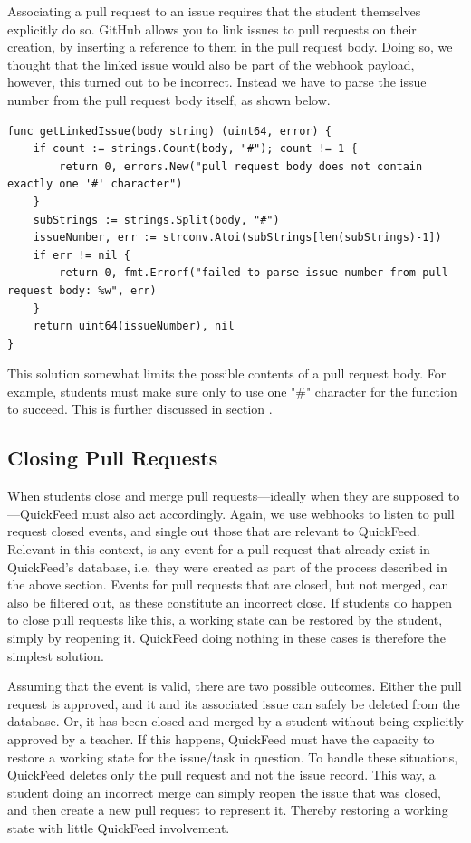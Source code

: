 Associating a pull request to an issue requires that the student themselves explicitly do so.
GitHub allows you to link issues to pull requests on their creation, by inserting a reference to them in the pull request body.
Doing so, we thought that the linked issue would also be part of the webhook payload, however, this turned out to be incorrect.
Instead we have to parse the issue number from the pull request body itself, as shown below.
\begin{lstlisting}[caption={The getLinkedIssue function}, language=Golang]
func getLinkedIssue(body string) (uint64, error) {
	if count := strings.Count(body, "#"); count != 1 {
		return 0, errors.New("pull request body does not contain exactly one '#' character")
	}
	subStrings := strings.Split(body, "#")
	issueNumber, err := strconv.Atoi(subStrings[len(subStrings)-1])
	if err != nil {
		return 0, fmt.Errorf("failed to parse issue number from pull request body: %w", err)
	}
	return uint64(issueNumber), nil
}
\end{lstlisting}

This solution somewhat limits the possible contents of a pull request body.
For example, students must make sure only to use one "\#" character for the function to succeed.
This is further discussed in section .%

\subsection{Closing Pull Requests}

When students close and merge pull requests---ideally when they are supposed to---QuickFeed must also act accordingly.
Again, we use webhooks to listen to pull request closed events, and single out those that are relevant to QuickFeed.
Relevant in this context, is any event for a pull request that already exist in QuickFeed's database, i.e. they were created as part of the process described in the above section.
Events for pull requests that are closed, but not merged, can also be filtered out, as these constitute an incorrect close.
If students do happen to close pull requests like this, a working state can be restored by the student, simply by reopening it.
QuickFeed doing nothing in these cases is therefore the simplest solution.

Assuming that the event is valid, there are two possible outcomes.
Either the pull request is approved, and it and its associated issue can safely be deleted from the database.
Or, it has been closed and merged by a student without being explicitly approved by a teacher.
If this happens, QuickFeed must have the capacity to restore a working state for the issue/task in question.
To handle these situations, QuickFeed deletes only the pull request and not the issue record.
This way, a student doing an incorrect merge can simply reopen the issue that was closed, and then create a new pull request to represent it.
Thereby restoring a working state with little QuickFeed involvement.

